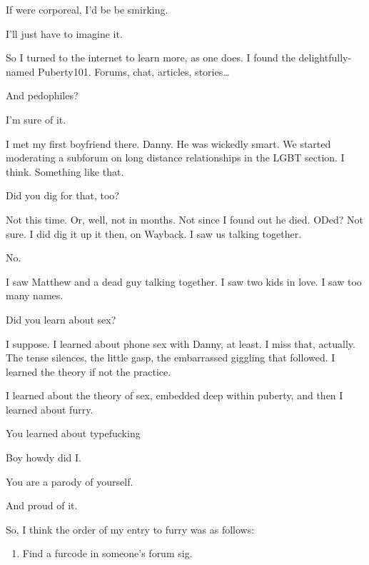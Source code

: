 \begin{leftcolumn}
\begin{ally}
If were corporeal, I'd be be smirking.
\end{ally}
I'll just have to imagine it.

So I turned to the internet to learn more, as one does. I found the delightfully-named Puberty101. Forums, chat, articles, stories\ldots{}

\begin{ally}
And pedophiles?
\end{ally}
I'm sure of it.

I met my first boyfriend there. Danny. He was wickedly smart. We started moderating a subforum on long distance relationships in the LGBT section. I think. Something like that.

\begin{ally}
Did you dig for that, too?
\end{ally}
Not this time. Or, well, not in months. Not since I found out he died. ODed? Not sure. I did dig it up it then, on Wayback. I saw us talking together.

No.

I saw Matthew and a dead guy talking together. I saw two kids in love. I saw too many names.

\begin{ally}
Did you learn about sex?
\end{ally}
I suppose. I learned about phone sex with Danny, at least. I miss that, actually. The tense silences, the little gasp, the embarrassed giggling that followed. I learned the theory if not the practice.

I learned about the theory of sex, embedded deep within puberty, and then I learned about furry.

\begin{ally}
You learned about typefucking
\end{ally}
Boy howdy did I.


\begin{ally}
You are a parody of yourself.
\end{ally}
And proud of it.
\newpage

So, I think the order of my entry to furry was as follows:

\begin{enumerate}
\def\labelenumi{\arabic{enumi}.}
\item
  Find a furcode in someone's forum sig.


\end{enumerate}
\end{leftcolumn}
